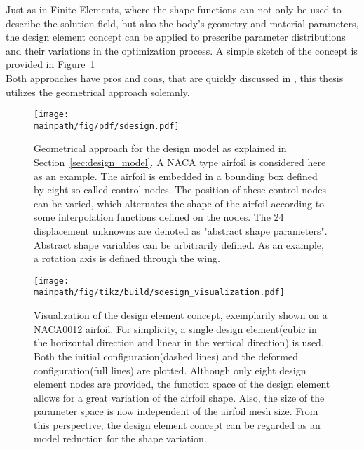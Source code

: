 \documentclass[../main.tex]{subfiles}
\begin{document}
Just as in Finite Elements, where the shape-functions can not only be used to describe the solution field, but also the body's geometry and material parameters, the design element concept can be applied to prescribe parameter distributions and their variations in the optimization process. A simple sketch of the concept is provided in Figure~\ref{fig:sketch_geometrical_approach}
\\
Both approaches have pros and cons, that are quickly discussed in \cite{Maute2003}, this thesis utilizes the geometrical approach solemnly.

\begin{figure}[h!]
	\begin{center}
        \texttt{[image: \\mainpath/fig/pdf/sdesign.pdf]}
        \caption[Design-model: geometrical approach]{Geometrical approach for the design model as explained in Section~\ref{sec:design_model}. A NACA type airfoil is considered here as an example. The airfoil is embedded in a bounding box defined by eight so-called control nodes. The position of these control nodes can be varied, which alternates the shape of the airfoil according to some interpolation functions defined on the nodes. The 24 displacement unknowns are denoted as "abstract shape parameters". Abstract shape variables can be arbitrarily defined. As an example, a rotation axis is defined through the wing.}
		\label{fig:sketch_geometrical_approach}
    \end{center}
\end{figure}

\begin{figure}[h!]
	\begin{center}
        \texttt{[image: \\mainpath/fig/tikz/build/sdesign\_visualization.pdf]}
        \caption[Design element visualization]{Visualization of the design element concept, exemplarily shown on a NACA0012 airfoil. For simplicity, a single design element(cubic in the horizontal direction and linear in the vertical direction) is used. Both the initial configuration(dashed lines) and the deformed configuration(full lines) are plotted. Although only eight design element nodes are provided, the function space of the design element allows for a great variation of the airfoil shape. Also, the size of the parameter space is now independent of the airfoil mesh size. From this perspective, the design element concept can be regarded as an model reduction for the shape variation.}
		\label{designelement_concept_2D}
    \end{center}
\end{figure}
\end{document}
